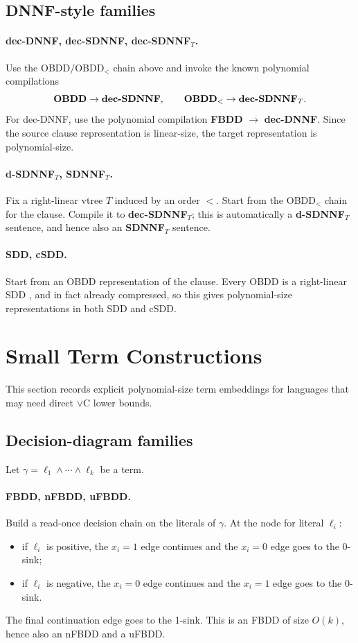 \documentclass[11pt]{article}
\newcommand{\langref}[1]{\textbf{#1}}
\newcommand{\langfam}[2]{\textbf{#1$_{#2}$}}
\begin{document}
\subsection{DNNF-style families}
\paragraph{\langref{dec-DNNF}, \langref{dec-SDNNF}, \langfam{dec-SDNNF}{T}.}
Use the OBDD/OBDD$_<$ chain above and invoke the known polynomial compilations
\[
\langref{OBDD} \to \langref{dec\mbox{-}SDNNF},
\qquad
\langfam{OBDD}{<} \to \langfam{dec\mbox{-}SDNNF}{T}.
\]
For dec-DNNF, use the polynomial compilation \langref{FBDD} $\to$ \langref{dec-DNNF}.
Since the source clause representation is linear-size, the target representation is polynomial-size.

\paragraph{\langfam{d-SDNNF}{T}, \langfam{SDNNF}{T}.}
Fix a right-linear vtree $T$ induced by an order $<$.
Start from the OBDD$_<$ chain for the clause.
Compile it to \langfam{dec-SDNNF}{T}; this is automatically a \langfam{d-SDNNF}{T} sentence, and hence also an \langfam{SDNNF}{T} sentence.

\paragraph{\langref{SDD}, \langref{cSDD}.}
Start from an OBDD representation of the clause.
Every OBDD is a right-linear SDD \citep{Darwiche_2011}, and in fact already compressed, so this gives polynomial-size representations in both SDD and cSDD.

\section{Small Term Constructions}
This section records explicit polynomial-size term embeddings for languages that may need direct $\lor$C lower bounds.

\subsection{Decision-diagram families}
Let $\gamma = \ell_1 \land \cdots \land \ell_k$ be a term.

\paragraph{\langref{FBDD}, \langref{nFBDD}, \langref{uFBDD}.}
Build a read-once decision chain on the literals of $\gamma$.
At the node for literal $\ell_i$:
\begin{itemize}[noitemsep]
  \item if $\ell_i$ is positive, the $x_i=1$ edge continues and the $x_i=0$ edge goes to the 0-sink;
  \item if $\ell_i$ is negative, the $x_i=0$ edge continues and the $x_i=1$ edge goes to the 0-sink.
\end{itemize}
The final continuation edge goes to the 1-sink.
This is an FBDD of size $O(k)$, hence also an nFBDD and a uFBDD.
\end{document}
